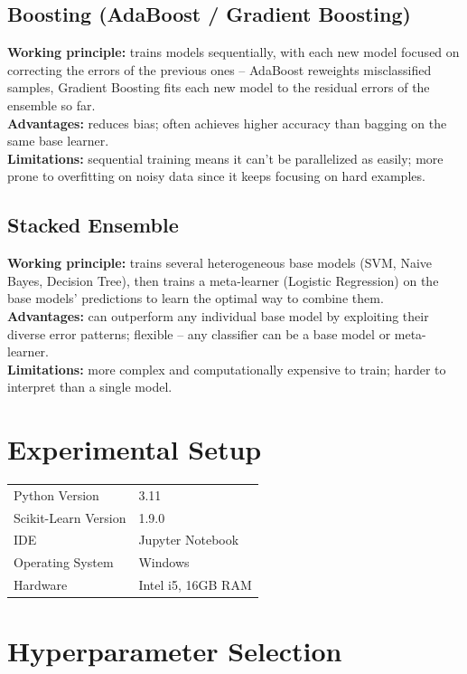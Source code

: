 \documentclass[12pt,a4paper]{article}
\begin{document}
\subsection*{Boosting (AdaBoost / Gradient Boosting)}
\textbf{Working principle:} trains models sequentially, with each new model
focused on correcting the errors of the previous ones -- AdaBoost reweights
misclassified samples, Gradient Boosting fits each new model to the residual
errors of the ensemble so far.\\
\textbf{Advantages:} reduces bias; often achieves higher accuracy than bagging on
the same base learner.\\
\textbf{Limitations:} sequential training means it can't be parallelized as easily;
more prone to overfitting on noisy data since it keeps focusing on hard examples.

\subsection*{Stacked Ensemble}
\textbf{Working principle:} trains several heterogeneous base models (SVM, Naive
Bayes, Decision Tree), then trains a meta-learner (Logistic Regression) on the
base models' predictions to learn the optimal way to combine them.\\
\textbf{Advantages:} can outperform any individual base model by exploiting their
diverse error patterns; flexible -- any classifier can be a base model or
meta-learner.\\
\textbf{Limitations:} more complex and computationally expensive to train; harder
to interpret than a single model.

\section{Experimental Setup}
\begin{tabular}{ll}
\toprule
Python Version & 3.11 \\
Scikit-Learn Version & 1.9.0 \\
IDE & Jupyter Notebook \\
Operating System & Windows \\
Hardware & Intel i5, 16GB RAM \\
\bottomrule
\end{tabular}

\section{Hyperparameter Selection}
\end{document}

